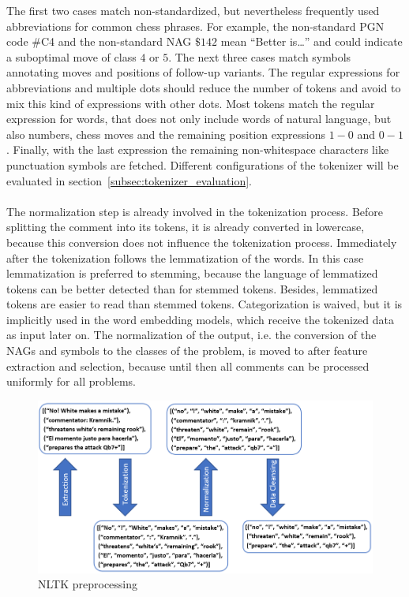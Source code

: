 \documentclass[article,type=msc,colorback,accentcolor=tud7b]{tudthesis}
\begin{document}
    The first two cases match non-standardized, but nevertheless frequently used abbreviations for common chess phrases. For example, the non-standard PGN code \#C4 and the non-standard NAG $\$142$ mean “Better is…” and could indicate a suboptimal move of class $4$ or $5$. The next three cases match symbols annotating moves and positions of follow-up variants. The regular expressions for abbreviations and multiple dots should reduce the number of tokens and avoid to mix this kind of expressions with other dots. Most tokens match the regular expression for words, that does not only include words of natural language, but also numbers, chess moves and the remaining position expressions $1-0$ and $0-1$. Finally, with the last expression the remaining non-whitespace characters like punctuation symbols are fetched. Different configurations of the tokenizer will be evaluated in section~\ref{subsec:tokenizer_evaluation}. \\\\
    The normalization step is already involved in the tokenization process. Before splitting the comment into its tokens, it is already converted in lowercase, because this conversion does not influence the tokenization process. Immediately after the tokenization follows the lemmatization of the words. In this case lemmatization is preferred to stemming, because the language of lemmatized tokens can be better detected than for stemmed tokens. Besides, lemmatized tokens are easier to read than stemmed tokens. Categorization is waived, but it is implicitly used in the word embedding models, which receive the tokenized data as input later on. The normalization of the output, i.e. the conversion of the NAGs and symbols to the classes of the problem, is moved to after feature extraction and selection, because until then all comments can be processed uniformly for all problems.

    \begin{figure}[H]
      \centering
      \includegraphics[scale=0.9]{images/nltk_preprocessing}
      \caption{NLTK preprocessing}
      \label{fig:nltk_preprocessing}
	\end{figure}  
    
\end{document}
